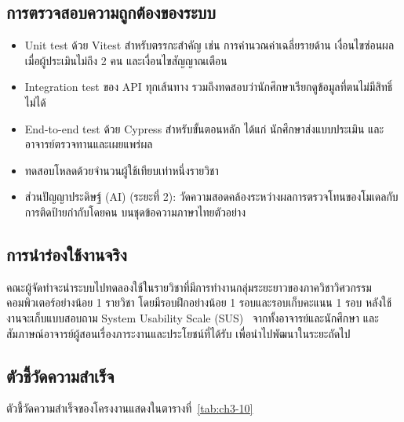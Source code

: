 \subsection{การตรวจสอบความถูกต้องของระบบ}\label{sec:3.10.1}

\begin{itemize}
  \item Unit test ด้วย Vitest สำหรับตรรกะสำคัญ เช่น การคำนวณค่าเฉลี่ยรายด้าน เงื่อนไขซ่อนผลเมื่อผู้ประเมินไม่ถึง 2 คน และเงื่อนไขสัญญาณเตือน
  \item Integration test ของ API ทุกเส้นทาง รวมถึงทดสอบว่านักศึกษาเรียกดูข้อมูลที่ตนไม่มีสิทธิ์ไม่ได้
  \item End-to-end test ด้วย Cypress สำหรับขั้นตอนหลัก ได้แก่ นักศึกษาส่งแบบประเมิน และอาจารย์ตรวจทานและเผยแพร่ผล
  \item ทดสอบโหลดด้วยจำนวนผู้ใช้เทียบเท่าหนึ่งรายวิชา
  \item ส่วนปัญญาประดิษฐ์ (AI) (ระยะที่ 2): วัดความสอดคล้องระหว่างผลการตรวจโทนของโมเดลกับการติดป้ายกำกับโดยคน บนชุดข้อความภาษาไทยตัวอย่าง
\end{itemize}

\subsection{การนำร่องใช้งานจริง}\label{sec:3.10.2}

คณะผู้จัดทำจะนำระบบไปทดลองใช้ในรายวิชาที่มีการทำงานกลุ่มระยะยาวของภาควิชาวิศวกรรมคอมพิวเตอร์อย่างน้อย 1 รายวิชา โดยมีรอบฝึกอย่างน้อย 1 รอบและรอบเก็บคะแนน 1 รอบ หลังใช้งานจะเก็บแบบสอบถาม System Usability Scale (SUS)~\cite{brooke1996sus} จากทั้งอาจารย์และนักศึกษา และสัมภาษณ์อาจารย์ผู้สอนเรื่องภาระงานและประโยชน์ที่ได้รับ เพื่อนำไปพัฒนาในระยะถัดไป

\subsection{ตัวชี้วัดความสำเร็จ}\label{sec:3.10.3}

ตัวชี้วัดความสำเร็จของโครงงานแสดงในตารางที่~\ref{tab:ch3-10}

